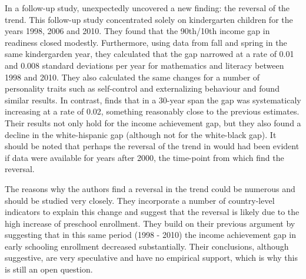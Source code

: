 \documentclass[11pt, a4paper]{article}\usepackage[]{graphicx}\usepackage[]{color}
\begin{document}
In a follow-up study, \citet{reardon_portilla} unexpectedly uncovered a new finding: the reversal of the trend. This follow-up study concentrated solely on kindergarten children for the years 1998, 2006 and 2010. They found that the 90th/10th income gap in readiness closed modestly. Furthermore, using data from fall and spring in the same kindergarden year, they calculated that the gap narrowed at a rate of 0.01 and 0.008 standard deviations per year for mathematics and literacy between 1998 and 2010. They also calculated the same changes for a number of personality traits such as self-control and externalizing behaviour and found similar results. In contrast, \citet{reardon2011} finds that in a 30-year span the gap was systematicaly increasing at a rate of 0.02, something reasonably close to the previous estimates. Their results not only hold for the income achievement gap, but they also found a decline in the white-hispanic gap (although not for the white-black gap). It should be noted that perhaps the reversal of the trend in \citet{reardon2011} would had been evident if data were available for years after 2000, the time-point from which \citet{reardon_portilla} find the reversal.

The reasons why the authors find a reversal in the trend could be numerous and should be studied very closely. They incorporate a number of country-level indicators to explain this change and suggest that the reversal is likely due to the high increase of preschool enrollment. They build on their previous argument by suggesting that in this same period (1998 - 2010) the income achievement gap in early schooling enrollment decreased substantially. Their conclusions, although suggestive, are very speculative and have no empirical support, which is why this is still an open question.
\end{document}
